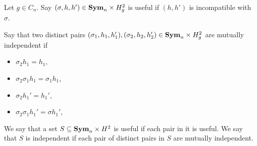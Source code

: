 \documentclass[../paper.tex]{subfiles}
\begin{document}




\begin{definition}
  Let $g \in C_n$. Say $(\sigma, h, h') \in \text{\textbf{Sym}}_n \times H^2_g$ is useful if
  $(h,h')$ is incompatible with $\sigma$.

  Say that two distinct pairs $(\sigma_1, h_1, h_1'), (\sigma_2, h_2, h_2') \in
  \text{\textbf{Sym}}_n\times H^2_g$ are mutually independent if
  \begin{itemize}
    \setlength\itemsep{0mm}
  \item $\sigma_2 h_1 = h_1$,
  \item $\sigma_2 \sigma_1 h_1 = \sigma_1 h_1$,
  \item $\sigma_2 h_1' = h_1'$,
  \item $\sigma_2 \sigma_1 h_1' = \sigma h_1'$,
  \end{itemize}
  
  We say that a set $S \subseteq \text{\textbf{Sym}}_n \times H^2$ is useful if each pair in it
  is useful. We say that $S$ is independent if each pair of distinct pairs in
  $S$ are mutually independent.
\end{definition}
\end{document}
